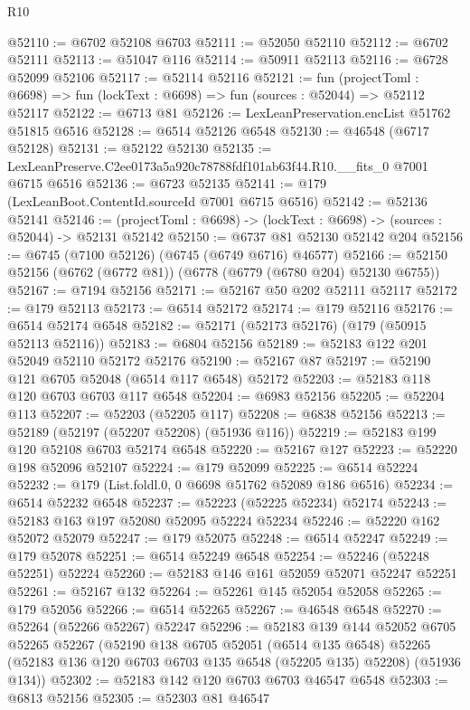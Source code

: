 \begin{lexlean}{R10}
\begin{coremodule}
@52110 := @6702 @52108 @6703
@52111 := @52050 @52110
@52112 := @6702 @52111
@52113 := @51047 @116
@52114 := @50911 @52113
@52116 := @6728 @52099 @52106
@52117 := @52114 @52116
@52121 := fun (projectToml : @6698) =>
  fun (lockText : @6698) => fun (sources : @52044) => @52112 @52117
@52122 := @6713 @81
@52126 := LexLeanPreservation.encList @51762 @51815 @6516
@52128 := @6514 @52126 @6548
@52130 := @46548 (@6717 @52128)
@52131 := @52122 @52130
@52135 := LexLeanPreserve.C2ee0173a5a920c78788fdf101ab63f44.R10.__fits_0 @7001 @6715 @6516
@52136 := @6723 @52135
@52141 := @179 (LexLeanBoot.ContentId.sourceId @7001 @6715 @6516)
@52142 := @52136 @52141
@52146 := (projectToml : @6698) -> (lockText : @6698) -> (sources : @52044) -> @52131 @52142
@52150 := @6737 @81 @52130 @52142 @204
@52156 := @6745 (@7100 @52126) (@6745 (@6749 @6716) @46577)
@52166 := @52150 @52156 (@6762 (@6772 @81)) (@6778 (@6779 (@6780 @204) @52130 @6755))
@52167 := @7194 @52156
@52171 := @52167 @50 @202 @52111 @52117
@52172 := @179 @52113
@52173 := @6514 @52172
@52174 := @179 @52116
@52176 := @6514 @52174 @6548
@52182 := @52171 (@52173 @52176) (@179 (@50915 @52113 @52116))
@52183 := @6804 @52156
@52189 := @52183 @122 @201 @52049 @52110 @52172 @52176
@52190 := @52167 @87
@52197 := @52190 @121 @6705 @52048 (@6514 @117 @6548) @52172
@52203 := @52183 @118 @120 @6703 @6703 @117 @6548
@52204 := @6983 @52156
@52205 := @52204 @113
@52207 := @52203 (@52205 @117)
@52208 := @6838 @52156
@52213 := @52189 (@52197 (@52207 @52208) (@51936 @116))
@52219 := @52183 @199 @120 @52108 @6703 @52174 @6548
@52220 := @52167 @127
@52223 := @52220 @198 @52096 @52107
@52224 := @179 @52099
@52225 := @6514 @52224
@52232 := @179 (List.foldl.{0, 0} @6698 @51762 @52089 @186 @6516)
@52234 := @6514 @52232 @6548
@52237 := @52223 (@52225 @52234) @52174
@52243 := @52183 @163 @197 @52080 @52095 @52224 @52234
@52246 := @52220 @162 @52072 @52079
@52247 := @179 @52075
@52248 := @6514 @52247
@52249 := @179 @52078
@52251 := @6514 @52249 @6548
@52254 := @52246 (@52248 @52251) @52224
@52260 := @52183 @146 @161 @52059 @52071 @52247 @52251
@52261 := @52167 @132
@52264 := @52261 @145 @52054 @52058
@52265 := @179 @52056
@52266 := @6514 @52265
@52267 := @46548 @6548
@52270 := @52264 (@52266 @52267) @52247
@52296 := @52183
    @139
    @144
    @52052
    @6705
    @52265
    @52267
    (@52190
      @138
      @6705
      @52051
      (@6514 @135 @6548)
      @52265
      (@52183 @136 @120 @6703 @6703 @135 @6548 (@52205 @135) @52208)
      (@51936 @134))
@52302 := @52183 @142 @120 @6703 @6703 @46547 @6548
@52303 := @6813 @52156
@52305 := @52303 @81 @46547

\end{coremodule}
\end{lexlean}

